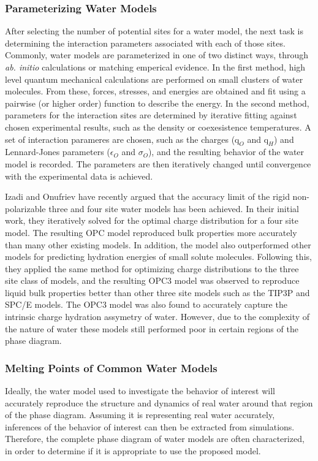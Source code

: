 \subsubsection{Parameterizing Water Models}
After selecting the number of potential sites for a water model, the
next task is determining the interaction parameters associated with
each of those sites. Commonly, water models are parameterized in one
of two distinct ways, through \textit{ab. initio} calculations or
matching emperical evidence. In the first method, high level quantum
mechanical calculations are performed on small clusters of water
molecules. From these, forces, stresses, and energies are obtained and
fit using a pairwise (or higher order) function to describe the
energy. In the second method, parameters for the interaction sites are
determined by iterative fitting against chosen experimental results,
such as the density or coexesistence temperatures. A set of
interaction parameres are chosen, such as the charges ($\mathrm{q}_O$
and $\mathrm{q}_H$) and Lennard-Jones parameters ($\epsilon_O$ and
$\sigma_O$), and the resulting behavior of the water model is
recorded. The parameters are then iteratively changed until
convergence with the experimental data is achieved. 

Izadi and Onufriev have recently argued that the accuracy limit of the
rigid non-polarizable three and four site water models has been
achieved.\cite{Izadi2014,Izadi2016} In their initial work, they
iteratively solved for the optimal charge distribution for a four site
model.\cite{Izadi2014} The resulting OPC model reproduced bulk
properties more accurately than many other existing models. In
addition, the model also outperformed other models for predicting
hydration energies of small solute molecules. Following this, they
applied the same method for optimizing charge distributions to the
three site class of models, and the resulting OPC3 model was observed
to reproduce liquid bulk properties better than other three site
models such as the TIP3P and SPC/E models. The OPC3 model was also
found to accurately capture the intrinsic charge hydration assymetry
of water. However, due to the complexity of the nature of water these
models still performed poor in certain regions of the phase diagram.

\subsubsection{Melting Points of Common Water Models}
Ideally, the water model used to investigate the behavior of interest
will accurately reproduce the structure and dynamics of real water
around that region of the phase diagram. Assuming it is representing
real water accurately, inferences of the behavior of interest can then
be extracted from simulations. Therefore, the complete phase diagram
of water models are often characterized, in order to determine if it
is appropriate to use the proposed model.

